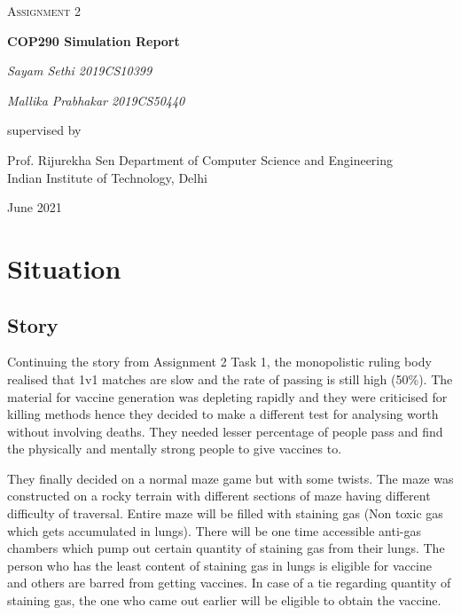 \documentclass[12pt]{report}
\begin{document}
\begin{titlepage}
	\centering
	\vspace{1cm}
	{\scshape\Large Assignment 2 \par}
	\vspace{1.5cm}
	{\huge\bfseries COP290 Simulation Report\par}
	\vspace{2cm}
	{\Large\itshape Sayam Sethi 2019CS10399\par}
	{\Large\itshape Mallika Prabhakar 2019CS50440\par}
	\vfill
	supervised by\par
	Prof. Rijurekha Sen
    \vfill
	Department of Computer Science and Engineering\\
	Indian Institute of Technology, Delhi\par
	\vfill

	{\large June 2021\par}
\end{titlepage}

\tableofcontents


\chapter{Situation}
\section{Story}
Continuing the story from Assignment 2 Task 1, the monopolistic ruling body realised that 1v1 matches are slow and the rate of passing is still high (50\%). The material for vaccine generation was depleting rapidly and they were criticised for killing methods hence they decided to make a different test for analysing worth without involving deaths. They needed lesser percentage of people pass and find the physically and mentally strong people to give vaccines to.

They finally decided on a normal maze game but with some twists. The maze was constructed on a rocky terrain with different sections of maze having different difficulty of traversal. Entire maze will be filled with staining gas (Non toxic gas which gets accumulated in lungs). There will be one time accessible anti-gas chambers which pump out certain quantity of staining gas from their lungs. The person who has the least content of staining gas in lungs is eligible for vaccine and others are barred from getting vaccines. In case of a tie regarding quantity of staining gas, the one who came out earlier will be eligible to obtain the vaccine.
\end{document}
